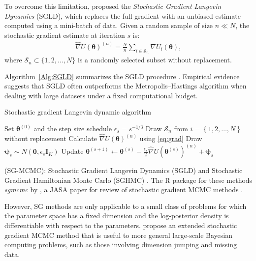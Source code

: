 To overcome this limitation, \cite{welling2011bayesian} proposed the \textit{Stochastic Gradient Langevin Dynamics} (SGLD), which replaces the full gradient with an unbiased estimate computed using a mini-batch of data. Given a random sample of size \( n \ll N \), the stochastic gradient estimate at iteration \( s \) is:
\begin{align} \label{eq:grad}
	\hat{\nabla} U(\boldsymbol{\theta})^{(n)} = \frac{N}{n} \sum_{i \in \mathcal{S}_n} \nabla U_i(\boldsymbol{\theta}),
\end{align}
where \( \mathcal{S}_n \subset \{1, 2, \dots, N\} \) is a randomly selected subset without replacement.

Algorithm~\ref{Alg:SGLD} summarizes the SGLD procedure \cite{nemeth2021stochastic}. Empirical evidence suggests that SGLD often outperforms the Metropolis–Hastings algorithm when dealing with large datasets under a fixed computational budget.

\begin{algorithm}[h!]
	\caption{Stochastic gradient Langevin dynamic algorithm}\label{Alg:SGLD}
	\begin{algorithmic}[1]
		\State Set $\bm{\theta}^{(0)}$ and the step size schedule $\epsilon_s=s^{-1/3}$  		 			
		\State Draw $\mathcal{S}_n$ from $i=\left\{1,2,\dots,N\right\}$ without replacement
		\State Calculate $\hat{\nabla} U(\boldsymbol{\theta})^{(n)}$ using \ref{eq:grad}  
		\State Draw $\boldsymbol{\psi}_s\sim N(\mathbf{0},\epsilon_s\mathbf{I}_K)$
		\State Update $\boldsymbol{\theta}^{(s+1)}\leftarrow \boldsymbol{\theta}^{(s)} -\frac{\epsilon_s}{2}\hat{\nabla} U(\boldsymbol{\theta}^{(s)})^{(n)}+\boldsymbol{\psi}_s$
		\EndFor 
	\end{algorithmic} 
\end{algorithm}
 


(SG-MCMC): Stochastic Gradient Langevin Dynamics (SGLD)  and Stochastic Gradient Hamiltonian Monte Carlo (SGHMC) \cite{chen2014stochastic}. The R package for these methods \textit{sgmcmc} by \cite{baker2019sgmcmc}, a JASA paper for review of stochastic gradient MCMC methods \cite{nemeth2021stochastic}. 

However, SG methods are only applicable to a small class of problems for which the parameter space has a fixed dimension and the log-posterior density is differentiable with respect to the parameters. \cite{song2020extended} propose an extended stochastic gradient MCMC method that is useful to more general large-scale Bayesian computing problems, such as those involving dimension jumping and missing data. 



